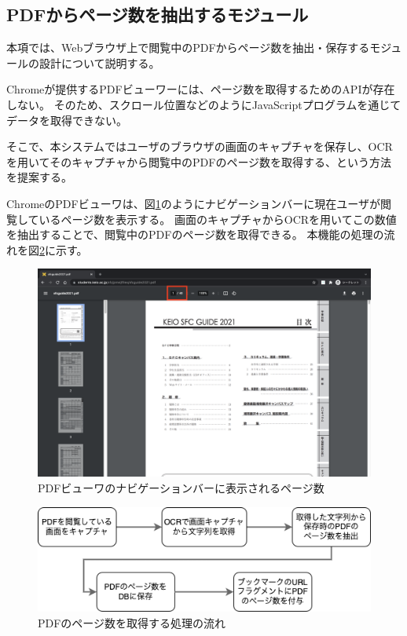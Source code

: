 \subsection{PDFからページ数を抽出するモジュール}
本項では、Webブラウザ上で閲覧中のPDFからページ数を抽出・保存するモジュールの設計について説明する。

Chromeが提供するPDFビューワーには、ページ数を取得するためのAPIが存在しない。
そのため、スクロール位置などのようにJavaScriptプログラムを通じてデータを取得できない。

そこで、本システムではユーザのブラウザの画面のキャプチャを保存し、OCRを用いてそのキャプチャから閲覧中のPDFのページ数を取得する、という方法を提案する。

ChromeのPDFビューワは、図\ref{fig:pdf-viewer-nav-bar-page-num}のようにナビゲーションバーに現在ユーザが閲覧しているページ数を表示する。
画面のキャプチャからOCRを用いてこの数値を抽出することで、閲覧中のPDFのページ数を取得できる。
本機能の処理の流れを図\ref{fig:design-pdf-page-num-extract}に示す。

\begin{figure}[htbp]
  \label{fig:pdf-viewer-nav-bar-page-num}
  \begin{center}
    \includegraphics[bb=0 0 1440 900,width=15cm]{img/040_design/pdf-viewer-nav-bar-page-num.pdf}
  \end{center}
  \caption{PDFビューワのナビゲーションバーに表示されるページ数}
\end{figure}

\begin{figure}[htbp]
  \label{fig:design-pdf-page-num-extract}
  \begin{center}
    \includegraphics[bb=0 0 511 161,width=15cm]{img/040_design/design-pdf-page-num-extract.pdf}
  \end{center}
  \caption{PDFのページ数を取得する処理の流れ}
\end{figure}

